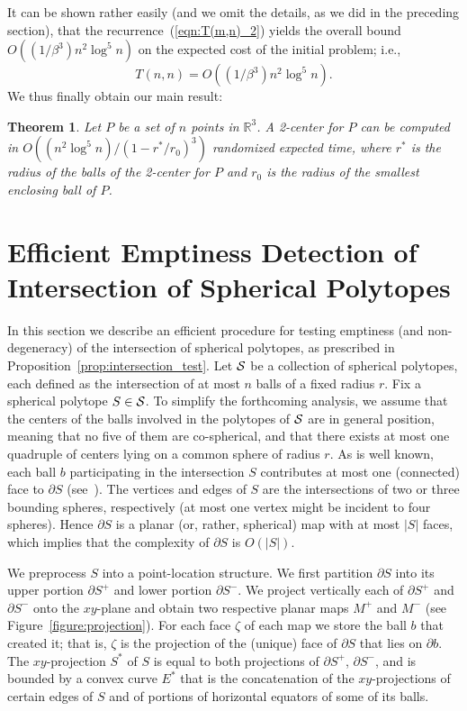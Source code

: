 \documentclass[a4paper,12pt]{article}
\def\S{{\cal S}}
\def\bd{{\partial}}
\newtheorem{theorem}{Theorem}[section]
\begin{document}
It can be shown rather easily (and we omit the details, as we did in
the preceding section), that the recurrence~(\ref{eqn:T(m,n)_2})
yields the overall bound $O\left((1/\beta^3) n^2 \log^5 n\right)$ on
the expected cost of the initial problem; i.e.,
$$T(n,n) = O\left((1/\beta^3) n^2 \log^5 n\right).$$ We thus finally obtain
our main result:
\begin{theorem}
Let $P$ be a set of $n$ points in $\mathbb{R}^3$. A 2-center for $P$
can be computed in $O((n^2 \log^5 n)/(1-r^*/r_0)^3 )$ randomized
expected time, where $r^*$ is the radius of the balls of the
2-center for $P$ and $r_0$ is the radius of the smallest enclosing
ball of $P$.
\end{theorem}

\section{Efficient Emptiness Detection of Intersection of Spherical
Polytopes} \label{sec:spherical_polytopes} In this section we
describe an efficient procedure for testing emptiness (and
non-degeneracy) of the intersection of spherical polytopes, as
prescribed in Proposition~\ref{prop:intersection_test}. Let $\S$ be
a collection of spherical polytopes, each defined as the
intersection of at most $n$ balls of a fixed radius $r$. Fix a
spherical polytope $S \in \S$. To simplify the forthcoming analysis,
we assume that the centers of the balls involved in the polytopes of
$\S$ are in general position, meaning that no five of them are
co-spherical, and that there exists at most one quadruple of centers
lying on a common sphere of radius $r$. As is well known, each ball
$b$ participating in the intersection $S$ contributes at most one
(connected) face to $\bd{S}$ (see~\cite{ER}). The vertices and edges
of $S$ are the intersections of two or three bounding spheres,
respectively (at most one vertex might be incident to four spheres).
Hence $\bd{S}$ is a planar (or, rather, spherical) map with at most
$|S|$ faces, which implies that the complexity of $\bd{S}$ is
$O(|S|)$.

We preprocess $S$ into a point-location structure. We first
partition $\bd{S}$ into its upper portion $\bd{S}^+$ and lower
portion $\bd{S}^-$. We project vertically each of $\bd{S}^+$ and
$\bd{S}^-$ onto the $xy$-plane and obtain two respective planar maps
$M^+$ and $M^-$ (see Figure~\ref{figure:projection}). For each face
$\zeta$ of each map we store the ball $b$ that created it; that is,
$\zeta$ is the projection of the (unique) face of $\bd{S}$ that lies
on $\bd{b}$. The $xy$-projection $S^*$ of $S$ is equal to both
projections of $\bd{S^+}$, $\bd{S^-}$, and is bounded by a convex
curve $E^*$ that is the concatenation of the $xy$-projections of
certain edges of $S$ and of portions of horizontal equators of some
of its balls.
\end{document}
